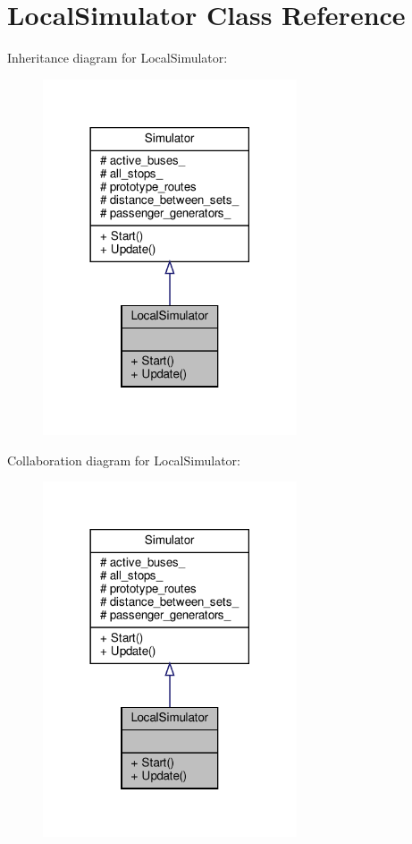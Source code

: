 \hypertarget{classLocalSimulator}{}\section{Local\+Simulator Class Reference}
\label{classLocalSimulator}


Inheritance diagram for Local\+Simulator\+:
\nopagebreak
\begin{figure}[H]
\begin{center}
\leavevmode
\includegraphics[width=213pt]{classLocalSimulator__inherit__graph}
\end{center}
\end{figure}


Collaboration diagram for Local\+Simulator\+:
\nopagebreak
\begin{figure}[H]
\begin{center}
\leavevmode
\includegraphics[width=213pt]{classLocalSimulator__coll__graph}
\end{center}
\end{figure}
